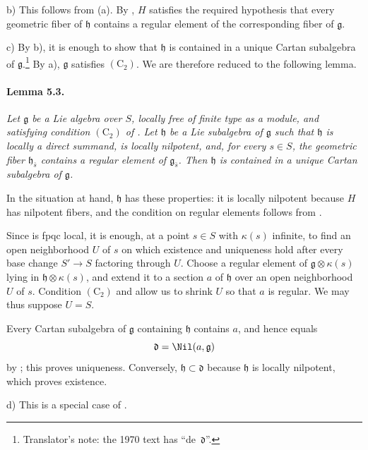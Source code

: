 \smallskip
\noindent
\textup{b)}
This follows from \textup{(a)}. By , \(H\) satisfies the
required hypothesis that every geometric fiber of \(\mathfrak h\)
contains a regular element of the corresponding fiber of
\(\mathfrak g\).

\smallskip
\noindent
\textup{c)}
By \textup{b)}, it is enough to show that \(\mathfrak h\) is
contained in a unique Cartan subalgebra of \(\mathfrak g\).\footnote{Translator's note: the 1970 text has ``de~\(\mathfrak d\)''.} By
\textup{a)}, \(\mathfrak g\) satisfies \((\mathrm C_2)\). We are
therefore reduced to the following lemma.

\paragraph{\textbf{Lemma 5.3.}}
{\itshape Let \(\mathfrak g\) be a Lie algebra over \(S\), locally
free of finite type as a module, and satisfying condition
\((\mathrm C_2)\) of . Let \(\mathfrak h\) be a Lie subalgebra
of \(\mathfrak g\) such that \(\mathfrak h\) is locally a direct
summand, is locally nilpotent, and, for every \(s\in S\), the
geometric fiber \(\mathfrak h_{\bar s}\) contains a regular element
of \(\mathfrak g_{\bar s}\). Then \(\mathfrak h\) is contained in
a unique Cartan subalgebra of \(\mathfrak g\).}

In the situation at hand, \(\mathfrak h\) has these properties: it
is locally nilpotent because \(H\) has nilpotent fibers, and the
condition on regular elements follows from .

Since  is fpqc local, it is enough, at a point \(s\in S\) with
\(\kappa(s)\) infinite, to find an open neighborhood \(U\) of \(s\)
on which existence and uniqueness hold after every base change
\(S'\to S\) factoring through \(U\). Choose a regular element of
\(\mathfrak g\otimes\kappa(s)\) lying in
\(\mathfrak h\otimes\kappa(s)\), and extend it to a section \(a\)
of \(\mathfrak h\) over an open neighborhood \(U\) of \(s\).
Condition \((\mathrm C_2)\) and  allow us to shrink \(U\) so
that \(a\) is regular. We may thus suppose \(U=S\).

Every Cartan subalgebra of \(\mathfrak g\) containing
\(\mathfrak h\) contains \(a\), and hence equals
\[
  \mathfrak d=\Nil(a,\mathfrak g)
\]
by ; this proves uniqueness. Conversely,
\(\mathfrak h\subset\mathfrak d\) because \(\mathfrak h\) is
locally nilpotent, which proves existence.

\smallskip
\noindent
\textup{d)}
This is a special case of \textup{}.
